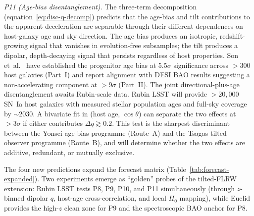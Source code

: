 \emph{P11 (Age-bias disentanglement).}
The three-term decomposition
(equation~\eqref{eq:disc-q-decomp}) predicts that the age-bias
and tilt contributions to the apparent deceleration are
separable through their different dependences on host-galaxy
age and sky direction.  The age bias produces an isotropic,
redshift-growing signal that vanishes in evolution-free
subsamples; the tilt produces a dipolar, depth-decaying signal
that persists regardless of host properties.
Son et~al.~\cite{Son2025,Son2025b} have established the
progenitor age bias at $5.5\sigma$ significance across $> 300$
host galaxies (Part~I) and report alignment with DESI BAO
results suggesting a non-accelerating component at
$> 9\sigma$ (Part~II).  The joint directional-plus-age
disentanglement awaits Rubin-scale data.
Rubin LSST will provide $> 20{,}000$ SN~Ia host galaxies with
measured stellar population ages and full-sky coverage by
$\sim\!2030$.  A bivariate fit in (host age, $\cos\theta$) can
separate the two effects at $> 3\sigma$ if either contributes
$\Delta q \gtrsim 0.2$.  This test is the sharpest discriminant
between the Yonsei age-bias programme (Route~A) and the Tsagas
tilted-observer programme (Route~B), and will determine whether
the two effects are additive, redundant, or mutually exclusive.



The four new predictions expand the forecast matrix
(Table~\ref{tab:forecast-expanded}).  Two experiments emerge as
``golden'' probes of the tilted-FLRW extension:
Rubin LSST tests P8, P9, P10, and P11 simultaneously (through
$z$-binned dipolar $q$, host-age cross-correlation, and local
$H_0$ mapping), while Euclid provides the high-$z$ clean zone
for P9 and the spectroscopic BAO anchor for P8.

